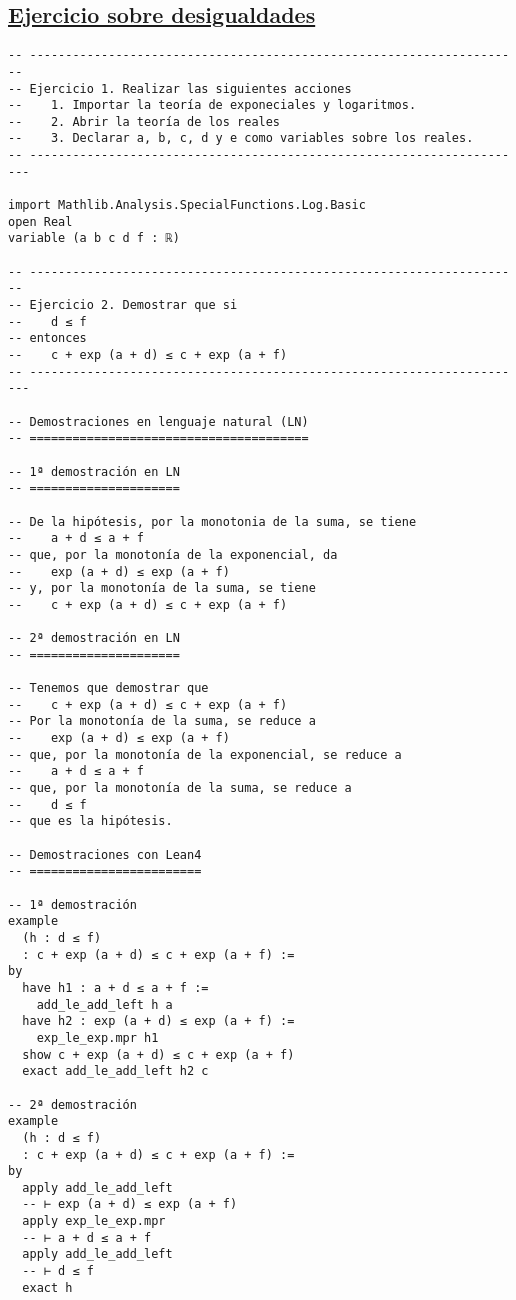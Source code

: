 \subsection{\href{./src/Basicos/Ejercicio\_sobre\_desigualdades.lean}{Ejercicio sobre desigualdades}}
\label{sec:org00fe9fe}
\begin{verbatim}
-- ---------------------------------------------------------------------
-- Ejercicio 1. Realizar las siguientes acciones
--    1. Importar la teoría de exponeciales y logaritmos.
--    2. Abrir la teoría de los reales
--    3. Declarar a, b, c, d y e como variables sobre los reales.
-- ----------------------------------------------------------------------

import Mathlib.Analysis.SpecialFunctions.Log.Basic
open Real
variable (a b c d f : ℝ)

-- ---------------------------------------------------------------------
-- Ejercicio 2. Demostrar que si
--    d ≤ f
-- entonces
--    c + exp (a + d) ≤ c + exp (a + f)
-- ----------------------------------------------------------------------

-- Demostraciones en lenguaje natural (LN)
-- =======================================

-- 1ª demostración en LN
-- =====================

-- De la hipótesis, por la monotonia de la suma, se tiene
--    a + d ≤ a + f
-- que, por la monotonía de la exponencial, da
--    exp (a + d) ≤ exp (a + f)
-- y, por la monotonía de la suma, se tiene
--    c + exp (a + d) ≤ c + exp (a + f)

-- 2ª demostración en LN
-- =====================

-- Tenemos que demostrar que
--    c + exp (a + d) ≤ c + exp (a + f)
-- Por la monotonía de la suma, se reduce a
--    exp (a + d) ≤ exp (a + f)
-- que, por la monotonía de la exponencial, se reduce a
--    a + d ≤ a + f
-- que, por la monotonía de la suma, se reduce a
--    d ≤ f
-- que es la hipótesis.

-- Demostraciones con Lean4
-- ========================

-- 1ª demostración
example
  (h : d ≤ f)
  : c + exp (a + d) ≤ c + exp (a + f) :=
by
  have h1 : a + d ≤ a + f :=
    add_le_add_left h a
  have h2 : exp (a + d) ≤ exp (a + f) :=
    exp_le_exp.mpr h1
  show c + exp (a + d) ≤ c + exp (a + f)
  exact add_le_add_left h2 c

-- 2ª demostración
example
  (h : d ≤ f)
  : c + exp (a + d) ≤ c + exp (a + f) :=
by
  apply add_le_add_left
  -- ⊢ exp (a + d) ≤ exp (a + f)
  apply exp_le_exp.mpr
  -- ⊢ a + d ≤ a + f
  apply add_le_add_left
  -- ⊢ d ≤ f
  exact h


\end{verbatim}
